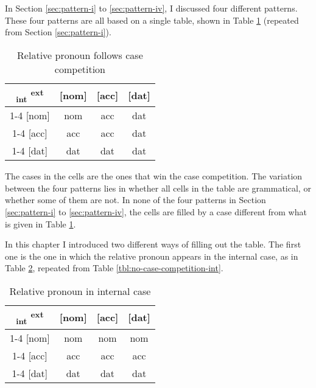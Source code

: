 In Section \ref{sec:pattern-i} to \ref{sec:pattern-iv}, I discussed four different patterns. These four patterns are all based on a single table, shown in Table \ref{tbl:case-competition-int-ext-typology} (repeated from Section \ref{sec:pattern-i}).

\begin{table}[ht]
  \center
  \caption{Relative pronoun follows case competition}
  \begin{tabular}{c|c|c|c}
    \toprule
    \textsubscript{\ac{int}} \textsuperscript{\ac{ext}}
           & [\ac{nom}]
           & [\ac{acc}]
           & [\ac{dat}]
           \\ \cmidrule{1-4}
       [\ac{nom}]
           & \ac{nom}
           & \ac{acc}
           & \ac{dat}
           \\ \cmidrule{1-4}
       [\ac{acc}]
           & \ac{acc}
           & \ac{acc}
           & \ac{dat}
           \\ \cmidrule{1-4}
       [\ac{dat}]
           & \ac{dat}
           & \ac{dat}
           & \ac{dat}
           \\
     \bottomrule
  \end{tabular}
    \label{tbl:case-competition-int-ext-typology}
\end{table}

The cases in the cells are the ones that win the case competition.
The variation between the four patterns lies in whether all cells in the table are grammatical, or whether some of them are not. In none of the four patterns in Section \ref{sec:pattern-i} to \ref{sec:pattern-iv}, the cells are filled by a case different from what is given in Table \ref{tbl:case-competition-int-ext-typology}.

In this chapter I introduced two different ways of filling out the table. The first one is the one in which the relative pronoun appears in the internal case, as in Table \ref{tbl:no-case-competition-int-typology}, repeated from Table \ref{tbl:no-case-competition-int}.

\begin{table}[ht]
  \center
  \caption{Relative pronoun in internal case}
  \begin{tabular}{c|c|c|c}
    \toprule
   \textsubscript{\ac{int}} \textsuperscript{\ac{ext}}
          & [\ac{nom}]
          & [\ac{acc}]
          & [\ac{dat}]
          \\ \cmidrule{1-4}
      [\ac{nom}]
          & \ac{nom}
          & \ac{nom}
          & \ac{nom}
          \\ \cmidrule{1-4}
      [\ac{acc}]
          & \ac{acc}
          & \ac{acc}
          & \ac{acc}
          \\ \cmidrule{1-4}
      [\ac{dat}]
          & \ac{dat}
          & \ac{dat}
          & \ac{dat}
          \\
    \bottomrule
  \end{tabular}
  \label{tbl:no-case-competition-int-typology}
\end{table}

